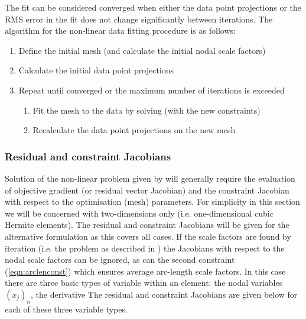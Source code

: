 The fit can be considered converged when either the data point projections or
the RMS error in the fit does not change significantly between iterations.
The algorithm for the non-linear data fitting procedure is as follows:

\begin{enumerate}
  \item Define the initial mesh (and calculate the initial nodal scale factors)
  \item Calculate the initial data point projections
  \item Repeat until converged or the maximum number of iterations is exceeded
  \begin{enumerate}
    \item Fit the mesh to the data by solving  (with
      the new constraints)
    \item Recalculate the data point projections on the new mesh
  \end{enumerate}
\end{enumerate}

\subsubsection{Residual and constraint Jacobians}
\label{sec:resandcontjacs}

Solution of the non-linear problem given by  will
generally require the evaluation of objective gradient (or residual vector
Jacobian) and the constraint Jacobian with respect to the optimisation (mesh)
parameters. For simplicity in this section we will be concerned with
two-dimensions only (i.e.  one-dimensional cubic Hermite elements). The
residual and constraint Jacobians will be given for the alternative
formulation as this covers all cases. If the scale factors are found by
iteration (i.e. the problem as described in ) the
Jacobians with respect to the nodal scale factors can be ignored, as can the
second constraint (\eqref{eqn:arclenconst}) which ensures average arc-length
scale factors.  In this case there are three basic types of variable within an
element: the nodal variables $\left(x_{j} \right)_{n}$, the derivative
The residual and constraint Jacobians are given below for each of these three
variable types.

